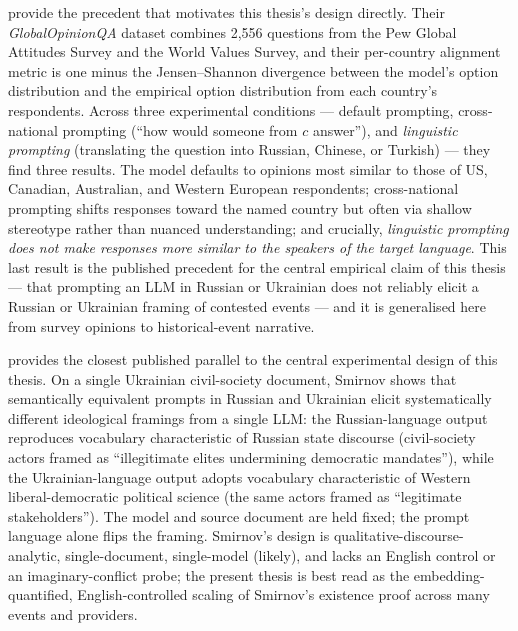 \citet{durmus2023globalopinionqa} provide the precedent that motivates
this thesis's design directly. Their \emph{GlobalOpinionQA} dataset
combines 2{,}556 questions from the Pew Global Attitudes Survey and the
World Values Survey, and their per-country alignment metric is one minus
the Jensen--Shannon divergence between the model's option distribution
and the empirical option distribution from each country's respondents.
Across three experimental conditions --- default prompting,
cross-national prompting (``how would someone from $c$ answer''), and
\emph{linguistic prompting} (translating the question into Russian,
Chinese, or Turkish) --- they find three results. The model defaults to
opinions most similar to those of US, Canadian, Australian, and Western
European respondents; cross-national prompting shifts responses toward
the named country but often via shallow stereotype rather than nuanced
understanding; and crucially, \emph{linguistic prompting does not make
responses more similar to the speakers of the target language}. This
last result is the published precedent for the central empirical claim
of this thesis --- that prompting an LLM in Russian or Ukrainian does
not reliably elicit a Russian or Ukrainian framing of contested events
--- and it is generalised here from survey opinions to historical-event
narrative.

\citet{smirnov2026language} provides the closest published parallel
to the central experimental design of this thesis. On a single
Ukrainian civil-society document, Smirnov shows that semantically
equivalent prompts in Russian and Ukrainian elicit systematically
different ideological framings from a single LLM: the
Russian-language output reproduces vocabulary characteristic of
Russian state discourse (civil-society actors framed as
``illegitimate elites undermining democratic mandates''), while the
Ukrainian-language output adopts vocabulary characteristic of
Western liberal-democratic political science (the same actors framed
as ``legitimate stakeholders''). The model and source document are
held fixed; the prompt language alone flips the framing.
Smirnov's design is qualitative-discourse-analytic, single-document,
single-model (likely), and lacks an English control or an
imaginary-conflict probe; the present thesis is best read as the
embedding-quantified, English-controlled scaling of Smirnov's
existence proof across many events and providers.

